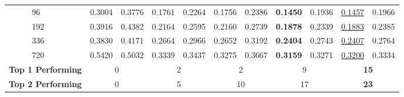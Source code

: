 \begin{table}[ht!]
{\begin{tabular}{ |p{1.7cm}||p{0.15cm}|p{1.05cm}|p{1.05cm}|p{1.05cm}||p{1.05cm}|p{1.05cm}|p{1.05cm}|p{1.1cm}||p{1.05cm}|p{1.15cm}|p{1.05cm}| }
 & 96 & 	0.3004 & 	0.3776	 & 0.1761 & 	0.2264	 & 0.1756 & 0.2386 & 	\textbf{0.1450}	 & 0.1936	 & \underline{0.1457}	 & 0.1966\\
 & 192 & 	0.3916	 & 0.4382 & 	0.2164 & 	0.2595	 & 0.2160 & 	0.2739 & 	\textbf{0.1878} & 	0.2339 & 	\underline{0.1883} & 	0.2385\\
 & 336 & 	0.3830 & 	0.4171 & 	0.2664 & 	0.2966 & 	0.2652	 & 0.3192	 & \textbf{0.2404}	 & 0.2743	 & \underline{0.2407}	 & 0.2764\\
 & 720 & 	0.5420	 & 0.5032	 & 0.3339	 & 0.3437 & 	0.3275 & 	0.3667 & 	\textbf{0.3159}	 & 0.3271 & 	\underline{0.3200}	 & 0.3334\\
 \hline
 \multicolumn{2}{|c|}{\textbf{Top 1 Performing }} & \multicolumn{2}{|c|}{0} & \multicolumn{2}{|c|}{2} & \multicolumn{2}{|c|}{2} &\multicolumn{2}{|c|}{9} &\multicolumn{2}{|c|}{\textbf{15}}   \\
 \hline
 \multicolumn{2}{|c|}{\textbf{Top 2 Performing }} & \multicolumn{2}{|c|}{0} & \multicolumn{2}{|c|}{5} & \multicolumn{2}{|c|}{10} &\multicolumn{2}{|c|}{17} &\multicolumn{2}{|c|}{\textbf{23}}   \\
 \hline

\end{tabular}}
\label{tab2}
\end{table}